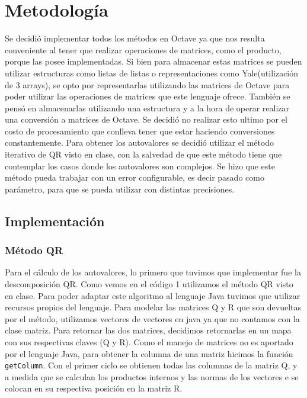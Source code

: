 \documentclass[a4paper,10pt]{article}
\begin{document}
\section{Metodología}
Se decidió implementar todos los métodos en Octave ya que nos resulta conveniente al tener que realizar operaciones de matrices, como el producto, porque las posee implementadas.
Si bien para almacenar estas matrices se pueden utilizar estructuras como listas de listas o representaciones como Yale(utilización de 3 arrays), se opto por representarlas utilizando las matrices de Octave para poder utilizar las operaciones de matrices que este lenguaje ofrece. También se pensó en almacenarlas utilizando una estructura y a la hora de operar realizar una conversión a matrices de Octave. Se decidió no realizar esto ultimo por el costo de procesamiento que conlleva tener que estar haciendo conversiones constantemente.
Para obtener los autovalores se decidió utilizar el método iterativo de QR visto en clase, con la salvedad de que este método tiene que contemplar los casos donde los autovalores son complejos. Se hizo que este método pueda trabajar con un error configurable, es decir pasado como parámetro, para que se pueda utilizar con distintas precisiones.

\subsection{Implementación}
\subsubsection{Método QR}

Para el cálculo de los autovalores, lo primero que tuvimos que implementar fue la descomposición QR. Como vemos en el código 1 utilizamos el método QR visto en clase. Para poder adaptar este algoritmo al lenguaje Java tuvimos que utilizar recursos propios del lenguaje. Para modelar las matrices Q y R que son devueltas por el método, utilizamos vectores de vectores en java ya que no contamos con la clase matriz. Para retornar las dos matrices, decidimos retornarlas en un mapa con sus respectivas claves (Q y R). Como el manejo de matrices no es aportado por el lenguaje Java, para obtener la columna de una matriz hicimos la función \texttt{getColumn}.  Con el primer ciclo se obtienen todas las columnas de la matriz Q, y a medida que se calculan los productos internos y las normas de los vectores e se colocan en su respectiva posición en la matriz R.
\end{document}

